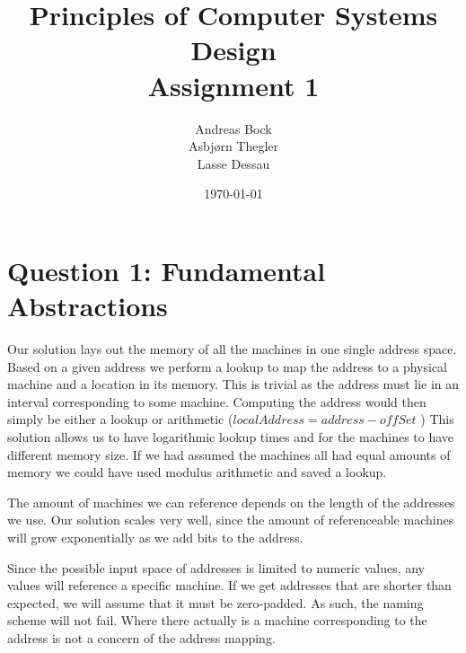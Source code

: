 \documentclass[11pt]{article}
\def\Author{Andreas Bock\\
Asbj\o rn Thegler\\
Lasse Dessau
}
\def\Title{\bf Principles of Computer Systems Design\\ {\Large Assignment 1}}
\begin{document}
\title{\Title}
\author{\Author}
\date{\today}
\maketitle

\section*{Question 1: Fundamental Abstractions}




Our solution lays out the memory of all the machines in one single address space.
Based on a given address we perform a lookup to map the address to a physical
machine and a location in its memory. This is trivial as the address must lie 
in an interval corresponding to some machine. Computing the address would
then simply be either a lookup or arithmetic ($ localAddress = address - offSet$ )
This solution allows us to have logarithmic lookup times and for the machines to
have different memory size. If we had assumed the machines all had equal amounts
of memory we could have used modulus arithmetic and saved a lookup.

%


The amount of machines we can reference depends on the
length of the addresses we use. Our solution scales very well, since the amount of
referenceable machines will grow exponentially as we add bits to the address.

Since the possible input space of addresses is limited to numeric values, any
values will reference a specific machine. If we get addresses that are shorter
than expected, we will assume that it must be zero-padded. As such, the naming
scheme will not fail. Where there actually is a machine corresponding to the
address is not a concern of the address mapping.
\end{document}
